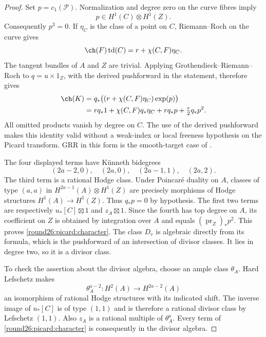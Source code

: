 \begin{proof}
Set $p=c_1(\mathcal P)$. Normalization and degree zero on the curve
fibres imply
\[
 p\in H^1(C)\otimes H^1(Z).
\]
Consequently $p^3=0$. If $\eta_C$ is the class of a point on $C$,
Riemann--Roch on the curve gives
\[
 \ch(F)\td(C)=r+\chi(C,F)\eta_C.
\]
The tangent bundles of $A$ and $Z$ are trivial. Applying
Grothendieck--Riemann--Roch to $q=u\times1_Z$, with the derived
pushforward in the statement, therefore gives
\begin{align*}
 \ch(K)
 &=q_*\bigl((r+\chi(C,F)\eta_C)\exp(p)\bigr)\\
 &=r q_*1+\chi(C,F)q_*\eta_C+r q_*p+\tfrac r2q_*p^2.
\end{align*}
All omitted products vanish by degree on $C$. The use of the derived
pushforward makes this identity valid without a weak-index or local
freeness hypothesis on the Picard transform. GRR in this form is the
smooth-target case of \cite[Chapter~18]{Round26Fulton98}.

The four displayed terms have K\"unneth bidegrees
\[
 (2a-2,0),\quad(2a,0),\quad(2a-1,1),\quad(2a,2).
\]
The third term is a rational Hodge class. Under Poincar\'e duality on
$A$, classes of type $(a,a)$ in
$H^{2a-1}(A)\otimes H^1(Z)$ are precisely morphisms of Hodge
structures $H^1(A)\to H^1(Z)$. Thus $q_*p=0$ by hypothesis.
The first two terms are respectively $u_*[C]\boxtimes1$ and
$z_A\boxtimes1$. Since the fourth has top degree on $A$, its
coefficient on $Z$ is obtained by integration over $A$ and equals
$(\operatorname{pr}_Z)_*p^2$. This proves \eqref{round26:picard:character}.
The class $D_v$ is algebraic directly from its formula, which is the
pushforward of an intersection of divisor classes. It lies in degree
two, so it is a divisor class.

To check the assertion about the divisor algebra, choose an ample
class $\theta_A$. Hard Lefschetz makes
\[
 \theta_A^{a-2}:H^2(A)\longrightarrow H^{2a-2}(A)
\]
an isomorphism of rational Hodge structures with its indicated shift.
The inverse image of $u_*[C]$ is of type $(1,1)$ and is therefore a
rational divisor class by Lefschetz $(1,1)$. Also $z_A$ is a rational
multiple of $\theta_A^a$. Every term of
\eqref{round26:picard:character} is consequently in the divisor algebra.


\end{proof}
